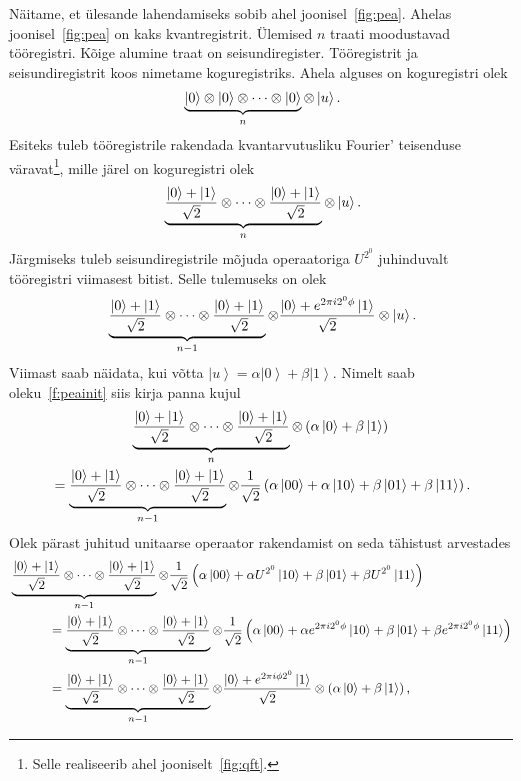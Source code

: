 \documentclass[12pt]{report}
\def\paren#1{\left(#1\right)}
\def\ket#1{\left|#1\right>}
\begin{document}
Näitame, et ülesande lahendamiseks sobib ahel joonisel~\ref{fig:pea}.
Ahelas joonisel~\ref{fig:pea} on kaks kvantregistrit.
Ülemised \(n\) traati moodustavad tööregistri.
Kõige alumine traat on seisundiregister.
Tööregistrit ja seisundiregistrit koos nimetame koguregistriks.
Ahela alguses on koguregistri olek
\begin{align}
    \underbrace{\ket{0} \otimes \ket{0} \otimes \cdots \otimes \ket{0}}_n \otimes \ket{u} \rlap{.}
\end{align}
Esiteks tuleb tööregistrile rakendada kvantarvutusliku Fourier' teisenduse väravat\footnote{Selle realiseerib ahel jooniselt~\ref{fig:qft}.}, mille järel on koguregistri olek
\begin{align}\label{f:peainit}
    \underbrace{\frac{\ket{0}+\ket{1}}{\sqrt{2}}
    \otimes \cdots
    \otimes \frac{\ket{0}+\ket{1}}{\sqrt{2}}}_n
    \otimes \ket{u} \rlap{.}
\end{align}
Järgmiseks tuleb seisundiregistrile mõjuda operaatoriga \(U^{2^0}\) juhinduvalt tööregistri viimasest bitist.
Selle tulemuseks on olek
\begin{align}\label{f:peau0}
    \underbrace{\frac{\ket{0}+\ket{1}}{\sqrt{2}}
    \otimes \cdots
    \otimes \frac{\ket{0}+\ket{1}}{\sqrt{2}}}_{n - 1}
    \otimes \frac{\ket{0}+e^{2\pi i2^0\phi}\ket{1}}{\sqrt{2}}
    \otimes \ket{u} \rlap{.}
\end{align}
Viimast saab näidata, kui võtta \(\ket{u} = \alpha\ket{0} + \beta\ket{1}\).
Nimelt saab oleku~\eqref{f:peainit} siis kirja panna kujul
\begin{multline}
    \underbrace{\frac{\ket{0}+\ket{1}}{\sqrt{2}}
    \otimes \cdots
    \otimes \frac{\ket{0}+\ket{1}}{\sqrt{2}}}_n
    \otimes \paren{\alpha \ket{0} + \beta \ket{1}} \\
    = \underbrace{\frac{\ket{0}+\ket{1}}{\sqrt{2}}
    \otimes \cdots
    \otimes \frac{\ket{0}+\ket{1}}{\sqrt{2}}}_{n - 1}
    \otimes \frac{1}{\sqrt{2}} \paren{
        \alpha \ket{00} + \alpha \ket{10}
        + \beta \ket{01} + \beta \ket{11}
    } \rlap{.}
\end{multline}
Olek pärast juhitud unitaarse operaator rakendamist on seda tähistust arvestades
\begin{align}
    &\underbrace{\frac{\ket{0}+\ket{1}}{\sqrt{2}}
    \otimes \cdots
    \otimes \frac{\ket{0}+\ket{1}}{\sqrt{2}}}_{n - 1}
    \otimes \frac{1}{\sqrt{2}} \paren{
        \alpha \ket{00} + \alpha U^{2^0} \ket{10}
        + \beta \ket{01} + \beta U^{2^0} \ket{11}
    } \\
    &\phantom{AAAA}= \underbrace{\frac{\ket{0}+\ket{1}}{\sqrt{2}}
    \otimes \cdots
    \otimes \frac{\ket{0}+\ket{1}}{\sqrt{2}}}_{n - 1}
    \otimes \frac{1}{\sqrt{2}} \paren{
        \alpha \ket{00} + \alpha e^{2\pi i2^0\phi} \ket{10}
        + \beta \ket{01} + \beta e^{2\pi i2^0\phi} \ket{11}
    } \\
    &\phantom{AAAA}= \underbrace{\frac{\ket{0}+\ket{1}}{\sqrt{2}}
    \otimes \cdots
    \otimes \frac{\ket{0}+\ket{1}}{\sqrt{2}}}_{n - 1}
    \otimes \frac{\ket{0} + e^{2\pi i\phi 2^0} \ket{1}}{\sqrt{2}}
    \otimes \paren{\alpha \ket{0} + \beta \ket{1}} \rlap{,}
\end{align}
\end{document}
